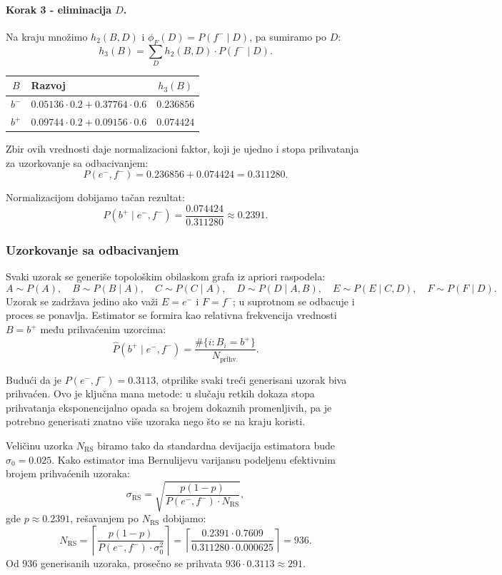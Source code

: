 \documentclass[12pt,a4paper]{article}
\begin{document}
\paragraph{Korak 3 - eliminacija $D$.}
Na kraju množimo $h_2(B,D)$ i $\phi_F(D) = P(f^-\mid D)$, pa sumiramo po $D$:
\[
  h_3(B) = \sum_D h_2(B,D)\cdot P(f^-\mid D).
\]

\begin{center}
\begin{tabular}{c|l|c}
  \toprule
  $B$ & Razvoj & $h_3(B)$ \\
  \midrule
  $b^-$ & $0.05136\cdot 0.2 + 0.37764\cdot 0.6$ & $0.236856$ \\
  $b^+$ & $0.09744\cdot 0.2 + 0.09156\cdot 0.6$ & $0.074424$ \\
  \bottomrule
\end{tabular}
\end{center}

Zbir ovih vrednosti daje normalizacioni faktor, koji je ujedno i stopa prihvatanja za
uzorkovanje sa odbacivanjem:
\[
  P(e^-,f^-) = 0.236856 + 0.074424 = 0.311280.
\]

Normalizacijom dobijamo tačan rezultat:
\[
  \boxed{P(b^+\mid e^-,f^-) = \frac{0.074424}{0.311280} \approx 0.2391.}
\]

\subsubsection*{Uzorkovanje sa odbacivanjem}

Svaki uzorak se generiše topološkim obilaskom grafa iz apriori raspodela:
\[
  A \sim P(A),\quad B \sim P(B\mid A),\quad C \sim P(C\mid A),\quad
  D \sim P(D\mid A,B),\quad E \sim P(E\mid C,D),\quad F \sim P(F\mid D).
\]
Uzorak se zadržava jedino ako važi $E = e^-$ i $F = f^-$;
u suprotnom se odbacuje i proces se ponavlja.
Estimator se formira kao relativna frekvencija vrednosti $B = b^+$ među prihvaćenim uzorcima:
\[
  \hat{P}(b^+\mid e^-,f^-) = \frac{\#\{i : B_i = b^+\}}{N_{\mathrm{prihv.}}}.
\]

Budući da je $P(e^-,f^-) = 0.3113$, otprilike svaki treći generisani uzorak biva prihvaćen.
Ovo je ključna mana metode: u slučaju retkih dokaza stopa prihvatanja eksponencijalno opada
sa brojem dokaznih promenljivih, pa je potrebno generisati znatno više uzoraka nego što
se na kraju koristi.

Veličinu uzorka $N_\mathrm{RS}$ biramo tako da standardna devijacija estimatora bude
$\sigma_0 = 0.025$. Kako estimator ima Bernulijevu varijansu podeljenu efektivnim
brojem prihvaćenih uzoraka:
\[
  \sigma_\mathrm{RS} = \sqrt{\frac{p(1-p)}{P(e^-,f^-)\cdot N_\mathrm{RS}}},
\]
gde $p \approx 0.2391$, rešavanjem po $N_\mathrm{RS}$ dobijamo:
\[
  N_\mathrm{RS} = \left\lceil \frac{p(1-p)}{P(e^-,f^-)\cdot\sigma_0^2} \right\rceil
  = \left\lceil \frac{0.2391\cdot 0.7609}{0.311280\cdot 0.000625} \right\rceil = 936.
\]
Od 936 generisanih uzoraka, prosečno se prihvata $936\cdot 0.3113 \approx 291$.
\end{document}
